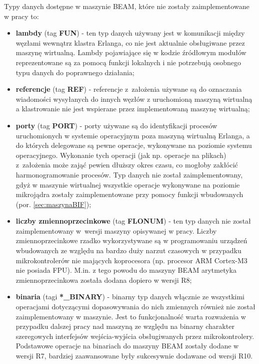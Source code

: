 Typy danych dostępne w maszynie BEAM, które nie zostały zaimplementowane w pracy to:
\begin{itemize}
\item \textbf{lambdy} (tag \textbf{FUN}) - ten typ danych używany jest w komunikacji między węzłami wewnątrz klastra Erlanga, co nie jest aktualnie obsługiwane przez maszynę wirtualną. Lambdy pojawiające się w kodzie źródłowym modułów reprezentowane są za pomocą funkcji lokalnych i nie potrzebują osobnego typu danych do poprawnego działania;
\item \textbf{referencje} (tag \textbf{REF}) - referencje z~założenia używane są do oznaczania wiadomości wysyłanych do innych węzłów z uruchomioną maszyną wirtualną a klastrowanie nie jest wspierane przez implementowaną maszynę wirtualną;
\item \textbf{porty} (tag \textbf{PORT}) - porty używane są do identyfikacji procesów uruchomionych w systemie operacyjnym poza maszyną wirtualną Erlanga, a do których delegowane są pewne operacje, wykonywane na poziomie systemu operacyjnego. Wykonanie tych operacji (jak np. operacje na plikach) z~założenia może zająć pewien dłuższy okres czasu, co mogłoby zakłócić harmonogramowanie procesów. Typ danych nie został zaimplementowany, gdyż w maszynie wirtualnej wszystkie operacje wykonywane na poziomie mikrojądra zostały zaimplementowane przy pomocy funkcji wbudowanych (por. \ref{sec:maszynaBIF});
\item \textbf{liczby zmiennoprzecinkowe} (tag \textbf{FLONUM}) - ten typ danych nie został zaimplementowany w~wersji maszyny opisywanej w pracy. Liczby zmiennoprzecinkowe rzadko wykorzystywane są w programowaniu urządzeń wbudowanych ze względu na bardzo duży narzut czasowych w przypadku mikrokontrolerów nie mających koprocesora (np. procesor ARM Cortex-M3 nie posiada FPU). M.in. z tego powodu do maszyny BEAM arytmetyka zmiennoprzecinkowa została dodana dopiero w wersji R8;
\item \textbf{binaria} (tagi \textbf{*\_BINARY}) - binarny typ danych włącznie ze wszystkimi operacjami dotyczącymi dopasowywania do nich zmiennych również nie został zaimplementowany w maszynie. Jest to funkcjonalność warta rozważenia w przypadku dalszej pracy nad maszyną ze względu na binarny charakter szeregowych interfejsów wejścia-wyjścia obsługiwanych przez mikrokontrolery. Podstawowe operacje na binariach do maszyny BEAM zostały dodane w wersji R7, bardziej zaawansowane były sukcesywnie dodawane od wersji R10.
\end{itemize}

